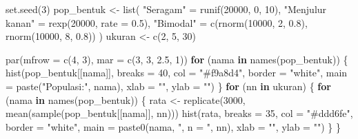 \documentclass[
  indonesian,
  letterpaper,
]{book}
\newenvironment{Shaded}{\begin{snugshade}}{\end{snugshade}}
\newcommand{\AttributeTok}[1]{\textcolor[rgb]{0.40,0.45,0.13}{#1}}
\newcommand{\ControlFlowTok}[1]{\textcolor[rgb]{0.00,0.23,0.31}{\textbf{#1}}}
\newcommand{\DecValTok}[1]{\textcolor[rgb]{0.68,0.00,0.00}{#1}}
\newcommand{\FloatTok}[1]{\textcolor[rgb]{0.68,0.00,0.00}{#1}}
\newcommand{\FunctionTok}[1]{\textcolor[rgb]{0.28,0.35,0.67}{#1}}
\newcommand{\NormalTok}[1]{\textcolor[rgb]{0.00,0.23,0.31}{#1}}
\newcommand{\OtherTok}[1]{\textcolor[rgb]{0.00,0.23,0.31}{#1}}
\newcommand{\StringTok}[1]{\textcolor[rgb]{0.13,0.47,0.30}{#1}}
\begin{document}
\begin{Shaded}
\begin{Highlighting}[]
\FunctionTok{set.seed}\NormalTok{(}\DecValTok{3}\NormalTok{)}
\NormalTok{pop\_bentuk }\OtherTok{\textless{}{-}} \FunctionTok{list}\NormalTok{(}
  \StringTok{"Seragam"}        \OtherTok{=} \FunctionTok{runif}\NormalTok{(}\DecValTok{20000}\NormalTok{, }\DecValTok{0}\NormalTok{, }\DecValTok{10}\NormalTok{),}
  \StringTok{"Menjulur kanan"} \OtherTok{=} \FunctionTok{rexp}\NormalTok{(}\DecValTok{20000}\NormalTok{, }\AttributeTok{rate =} \FloatTok{0.5}\NormalTok{),}
  \StringTok{"Bimodal"}        \OtherTok{=} \FunctionTok{c}\NormalTok{(}\FunctionTok{rnorm}\NormalTok{(}\DecValTok{10000}\NormalTok{, }\DecValTok{2}\NormalTok{, }\FloatTok{0.8}\NormalTok{), }\FunctionTok{rnorm}\NormalTok{(}\DecValTok{10000}\NormalTok{, }\DecValTok{8}\NormalTok{, }\FloatTok{0.8}\NormalTok{))}
\NormalTok{)}
\NormalTok{ukuran }\OtherTok{\textless{}{-}} \FunctionTok{c}\NormalTok{(}\DecValTok{2}\NormalTok{, }\DecValTok{5}\NormalTok{, }\DecValTok{30}\NormalTok{)}

\FunctionTok{par}\NormalTok{(}\AttributeTok{mfrow =} \FunctionTok{c}\NormalTok{(}\DecValTok{4}\NormalTok{, }\DecValTok{3}\NormalTok{), }\AttributeTok{mar =} \FunctionTok{c}\NormalTok{(}\DecValTok{3}\NormalTok{, }\DecValTok{3}\NormalTok{, }\FloatTok{2.5}\NormalTok{, }\DecValTok{1}\NormalTok{))}
\ControlFlowTok{for}\NormalTok{ (nama }\ControlFlowTok{in} \FunctionTok{names}\NormalTok{(pop\_bentuk)) \{}
  \FunctionTok{hist}\NormalTok{(pop\_bentuk[[nama]], }\AttributeTok{breaks =} \DecValTok{40}\NormalTok{, }\AttributeTok{col =} \StringTok{"\#f9a8d4"}\NormalTok{, }\AttributeTok{border =} \StringTok{"white"}\NormalTok{,}
       \AttributeTok{main =} \FunctionTok{paste}\NormalTok{(}\StringTok{"Populasi:"}\NormalTok{, nama), }\AttributeTok{xlab =} \StringTok{""}\NormalTok{, }\AttributeTok{ylab =} \StringTok{""}\NormalTok{)}
\NormalTok{\}}
\ControlFlowTok{for}\NormalTok{ (nn }\ControlFlowTok{in}\NormalTok{ ukuran) \{}
  \ControlFlowTok{for}\NormalTok{ (nama }\ControlFlowTok{in} \FunctionTok{names}\NormalTok{(pop\_bentuk)) \{}
\NormalTok{    rata }\OtherTok{\textless{}{-}} \FunctionTok{replicate}\NormalTok{(}\DecValTok{3000}\NormalTok{, }\FunctionTok{mean}\NormalTok{(}\FunctionTok{sample}\NormalTok{(pop\_bentuk[[nama]], nn)))}
    \FunctionTok{hist}\NormalTok{(rata, }\AttributeTok{breaks =} \DecValTok{35}\NormalTok{, }\AttributeTok{col =} \StringTok{"\#ddd6fe"}\NormalTok{, }\AttributeTok{border =} \StringTok{"white"}\NormalTok{,}
         \AttributeTok{main =} \FunctionTok{paste0}\NormalTok{(nama, }\StringTok{", n = "}\NormalTok{, nn), }\AttributeTok{xlab =} \StringTok{""}\NormalTok{, }\AttributeTok{ylab =} \StringTok{""}\NormalTok{)}
\NormalTok{  \}}
\NormalTok{\}}
\end{Highlighting}
\end{Shaded}
\end{document}
